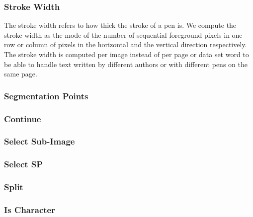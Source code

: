 \subsubsection{Stroke Width}
\label{sss:method:segmentaton:strokwidth}
The stroke width refers to how thick the stroke of a pen is. We compute the stroke width as the mode of the number of sequential foreground pixels in one row or column of pixels in the horizontal and the vertical direction respectively. The stroke width is computed per image instead of per page or data set word to be able to handle text written by different authors or with different pens on the same page.

\subsubsection{Segmentation Points}
\label{sss:method:segmentaton:segmentationpoints}

\subsubsection{Continue}
\label{sss:method:segmentaton:termination}

\subsubsection{Select Sub-Image}
\label{sss:method:segmentaton:selectsubimage}

\subsubsection{Select SP}
\label{sss:method:segmentaton:selectssp}

\subsubsection{Split}
\label{sss:method:segmentaton:splitimage}

\subsubsection{Is Character}
\label{sss:method:segmentaton:segmentfurther}
